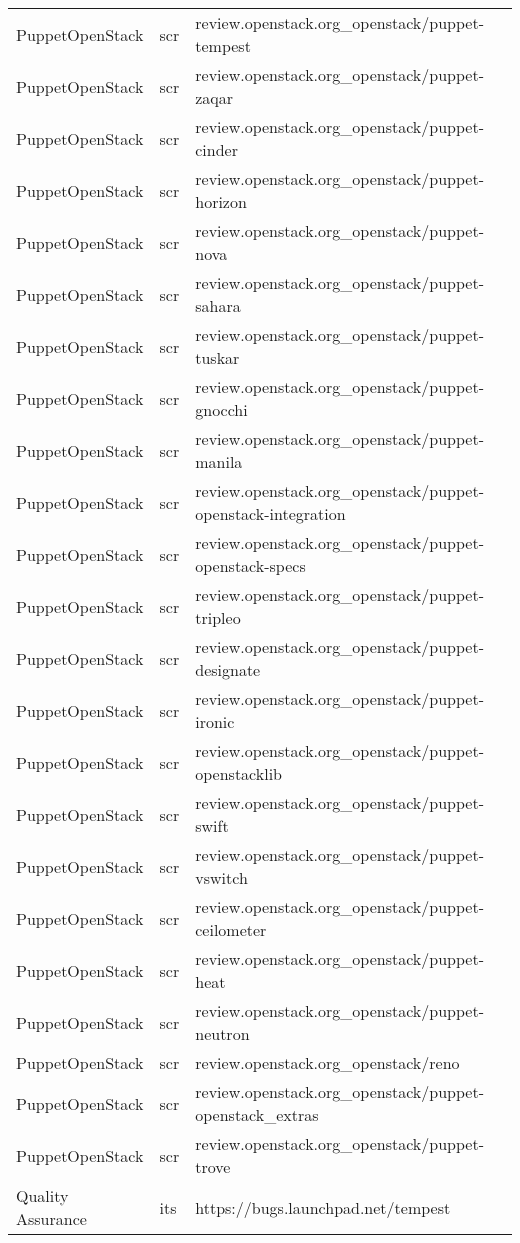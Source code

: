 \begin{center}
\begin{longtable}{|p{4cm}|p{1cm}|p{10cm}|}
PuppetOpenStack&scr&review.openstack.org\_openstack/puppet-tempest\\ 
PuppetOpenStack&scr&review.openstack.org\_openstack/puppet-zaqar\\ 
PuppetOpenStack&scr&review.openstack.org\_openstack/puppet-cinder\\ 
PuppetOpenStack&scr&review.openstack.org\_openstack/puppet-horizon\\ 
PuppetOpenStack&scr&review.openstack.org\_openstack/puppet-nova\\ 
PuppetOpenStack&scr&review.openstack.org\_openstack/puppet-sahara\\ 
PuppetOpenStack&scr&review.openstack.org\_openstack/puppet-tuskar\\ 
PuppetOpenStack&scr&review.openstack.org\_openstack/puppet-gnocchi\\ 
PuppetOpenStack&scr&review.openstack.org\_openstack/puppet-manila\\ 
PuppetOpenStack&scr&review.openstack.org\_openstack/puppet-openstack-integration\\ 
PuppetOpenStack&scr&review.openstack.org\_openstack/puppet-openstack-specs\\ 
PuppetOpenStack&scr&review.openstack.org\_openstack/puppet-tripleo\\ 
PuppetOpenStack&scr&review.openstack.org\_openstack/puppet-designate\\ 
PuppetOpenStack&scr&review.openstack.org\_openstack/puppet-ironic\\ 
PuppetOpenStack&scr&review.openstack.org\_openstack/puppet-openstacklib\\ 
PuppetOpenStack&scr&review.openstack.org\_openstack/puppet-swift\\ 
PuppetOpenStack&scr&review.openstack.org\_openstack/puppet-vswitch\\ 
PuppetOpenStack&scr&review.openstack.org\_openstack/puppet-ceilometer\\ 
PuppetOpenStack&scr&review.openstack.org\_openstack/puppet-heat\\ 
PuppetOpenStack&scr&review.openstack.org\_openstack/puppet-neutron\\ 
PuppetOpenStack&scr&review.openstack.org\_openstack/reno\\ 
PuppetOpenStack&scr&review.openstack.org\_openstack/puppet-openstack\_extras\\ 
PuppetOpenStack&scr&review.openstack.org\_openstack/puppet-trove\\ 
Quality Assurance&its&https://bugs.launchpad.net/tempest\\ 

\end{longtable}
\end{center}
